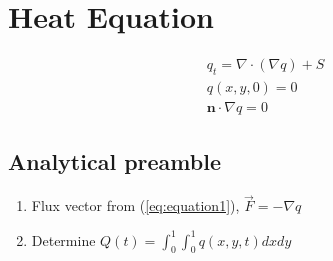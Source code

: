 

\section{Heat Equation} 

\label{sec:heat_equation}
\begin{align}
	& q_t = \nabla \cdot (\nabla q) + S \label{eq:equation1} \\
	& q(x,y,0) = 0 \label{eq:equation2} \\
	& \mathbf{n} \cdot \nabla q = 0 \label{eq:equation3}
\end{align}

\subsection{Analytical preamble} %
\label{sub:analytical_preamble}
\begin{enumerate}
	\item Flux vector from (\ref{eq:equation1}), $\vec{F}=-\nabla q$
	\item Determine $Q(t) = \int_{0}^{1} \int_{0}^{1} q(x,y,t)dxdy$
\end{enumerate}
